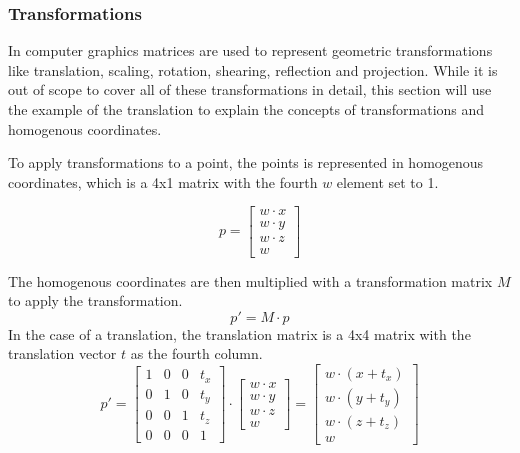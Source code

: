 \subsubsection{Transformations}

In computer graphics matrices are used to represent geometric transformations like translation, scaling, rotation,
shearing, reflection and projection.
While it is out of scope to cover all of these transformations in detail,
this section will use the example of the translation to explain the concepts of transformations and homogenous coordinates.

To apply transformations to a point, the points is represented in homogenous coordinates,
which is a 4x1 matrix with the fourth $w$ element set to 1.

\begin{equation}
    p = \begin{bmatrix}
            w \cdot x \\
            w \cdot y \\
            w \cdot z \\
            w
    \end{bmatrix}
\end{equation}

The homogenous coordinates are then multiplied with a transformation matrix $M$ to apply the transformation.
\begin{equation}
    p' = M \cdot p
\end{equation}
In the case of a translation, the translation matrix is a 4x4 matrix with the translation vector $t$ as the fourth column.
\begin{equation}
    p' = \begin{bmatrix}
             1 & 0 & 0 & t_x \\
             0 & 1 & 0 & t_y \\
             0 & 0 & 1 & t_z \\
             0 & 0 & 0 & 1
    \end{bmatrix} \cdot \begin{bmatrix}
                            w \cdot x \\
                            w \cdot y \\
                            w \cdot z \\
                            w
    \end{bmatrix} = \begin{bmatrix}
                        w \cdot (x + t_x) \\
                        w \cdot (y + t_y) \\
                        w \cdot (z + t_z) \\
                        w
    \end{bmatrix}
\end{equation}

